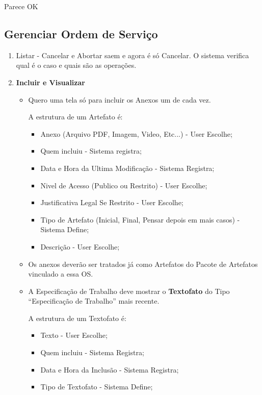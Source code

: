 	 Parece OK
	 
	\subsection{Gerenciar Ordem de Serviço}		 
	
	\begin{enumerate}
		\item Listar - Cancelar e Abortar saem e agora é só Cancelar. O sistema verifica qual é o caso e quais são as operações.
		
		\item \textbf{Incluir e Visualizar}
		
		\begin{itemize}
			\item Quero uma tela só para incluir os Anexos um de cada vez.
			
			
			A estrutura de um Artefato é:
			\begin{itemize}			
				\item Anexo (Arquivo PDF, Imagem, Video, Etc...) - User Escolhe;
				\item Quem incluiu - Sistema registra;
				\item Data e Hora da Ultima Modificação - Sistema Registra;
				\item Nivel de Acesso (Publico ou Restrito) - User Escolhe;
				\item Justificativa Legal Se Restrito - User Escolhe;
				\item Tipo de Artefato (Inicial, Final, Pensar depois em mais casos) - Sistema Define;
				\item Descrição - User Escolhe;
			\end{itemize}		
			
			
			\item Os anexos deverão ser tratados já como Artefatos do Pacote de Artefatos vinculado a essa OS.
			
			
			\item A Especificação de Trabalho deve mostrar o \textbf{Textofato} do Tipo ``Especificação de Trabalho'' mais recente.
			
			
			A estrutura de um Textofato é:
			\begin{itemize}			
				\item Texto - User Escolhe;
				\item Quem incluiu - Sistema Registra;
				\item Data e Hora da Inclusão - Sistema Registra;
				\item Tipo de Textofato - Sistema Define;
			\end{itemize}		
			
			
		\end{itemize}
	\end{enumerate}
